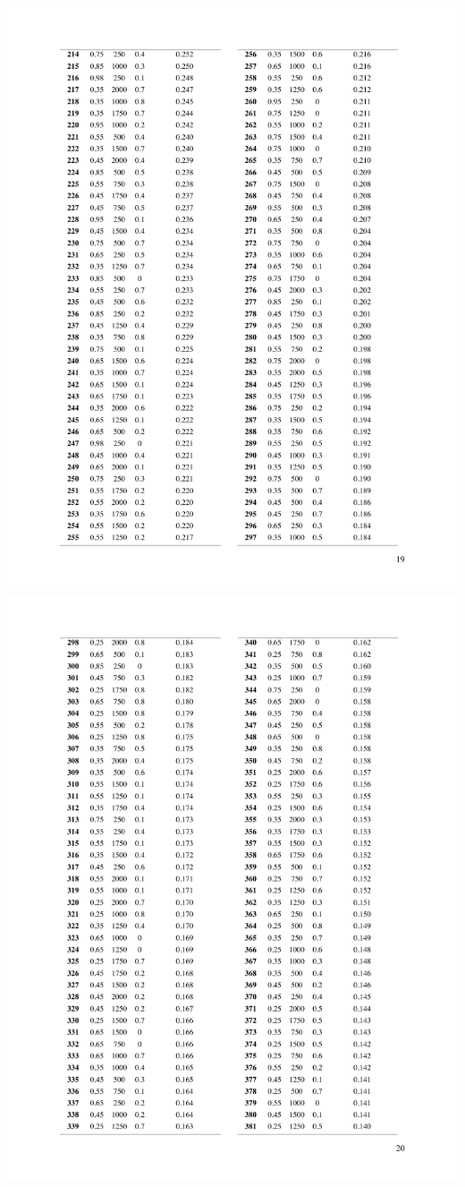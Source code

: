 \documentclass[a4paper, twoside]{templates/ociamthesis}
\begin{document}
\includegraphics[width=1\linewidth]{pdf_chapters/lights/lights_supp_crop_Part23}
\includegraphics[width=1\linewidth]{pdf_chapters/lights/lights_supp_crop_Part24}
\end{document}
